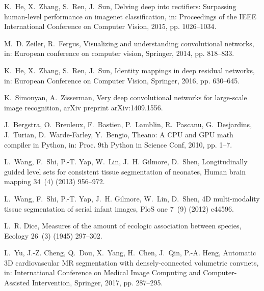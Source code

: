 \documentclass[twoside,espcrc2]{elsarticle}
\begin{document}
\begin{thebibliography}{10}
K.~He, X.~Zhang, S.~Ren, J.~Sun, Delving deep into rectifiers: Surpassing
  human-level performance on imagenet classification, in: Proceedings of the
  IEEE International Conference on Computer Vision, 2015, pp. 1026--1034.

M.~D. Zeiler, R.~Fergus, Visualizing and understanding convolutional networks,
  in: European conference on computer vision, Springer, 2014, pp. 818--833.

K.~He, X.~Zhang, S.~Ren, J.~Sun, Identity mappings in deep residual networks,
  in: European Conference on Computer Vision, Springer, 2016, pp. 630--645.

K.~Simonyan, A.~Zisserman, Very deep convolutional networks for large-scale
  image recognition, arXiv preprint arXiv:1409.1556.

J.~Bergstra, O.~Breuleux, F.~Bastien, P.~Lamblin, R.~Pascanu, G.~Desjardins,
  J.~Turian, D.~Warde-Farley, Y.~Bengio, Theano: {A} {CPU} and {GPU} math
  compiler in {P}ython, in: Proc. 9th Python in Science Conf, 2010, pp. 1--7.

L.~Wang, F.~Shi, P.-T. Yap, W.~Lin, J.~H. Gilmore, D.~Shen, Longitudinally
  guided level sets for consistent tissue segmentation of neonates, Human brain
  mapping 34~(4) (2013) 956--972.

L.~Wang, F.~Shi, P.-T. Yap, J.~H. Gilmore, W.~Lin, D.~Shen, {4D} multi-modality
  tissue segmentation of serial infant images, PloS one 7~(9) (2012) e44596.

L.~R. Dice, Measures of the amount of ecologic association between species,
  Ecology 26~(3) (1945) 297--302.

L.~Yu, J.-Z. Cheng, Q.~Dou, X.~Yang, H.~Chen, J.~Qin, P.-A. Heng, Automatic {3D}
  cardiovascular {MR} segmentation with densely-connected volumetric convnets,
  in: International Conference on Medical Image Computing and Computer-Assisted
  Intervention, Springer, 2017, pp. 287--295.
  
\end{thebibliography}
  
\end{document}

